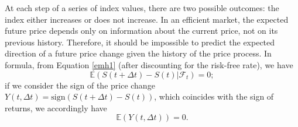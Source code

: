 \documentclass[a4paper]{jpconf}
\begin{document}
At each step of a series of index values, there are two possible outcomes: the index either increases or does not increase. In an efficient market, the expected future price depends only on information about the current price, not on its previous history. Therefore, it should be impossible to predict the expected direction of a future price change given the history of the price process. In formula, from Equation \eqref{emh1} (after discounting for the risk-free rate), we have\begin{equation}
\label{expectedincrement}
\mathbb{E}(S(t+\Delta t) - S(t)|\mathcal{F}_t)= 0;
\end{equation}
if we consider the sign of the price change $Y(t,\Delta t)=\mathrm{sign}(S(t+\Delta t)-S(t))$, which coincides with the sign of returns, we accordingly have
\begin{equation}
\label{expectedsign}
\mathbb{E}(Y(t,\Delta t))=0.
\end{equation}
\end{document}
